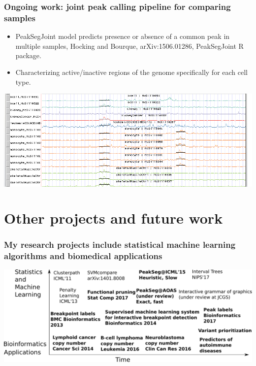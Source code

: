 \documentclass{beamer}
\begin{document}
\begin{frame}
  \frametitle{Ongoing work: joint peak calling pipeline for comparing samples}
\begin{itemize}
\item PeakSegJoint model predicts presence or absence of a common peak
  in multiple samples, Hocking and Bourque, arXiv:1506.01286,
  PeakSegJoint R package.
\item Characterizing active/inactive regions of the genome
  specifically for each cell type.
\end{itemize}
\includegraphics[width=\textwidth]{PeakSegJoint-monocytes-up}
\end{frame}

\section{Other projects and future work}

\begin{frame}
  \frametitle{My research projects include statistical machine
    learning algorithms and biomedical applications}
  \includegraphics[width=\textwidth]{timeline-SteJustine}
\end{frame}
\end{document}
